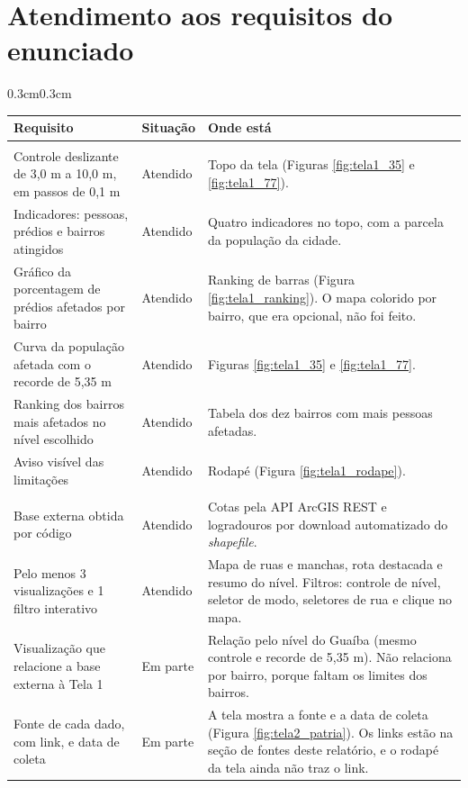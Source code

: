 \documentclass[12pt,a4paper]{article}
\begin{document}
\section{Atendimento aos requisitos do enunciado}
    \begin{adjustwidth}{0.3cm}{0.3cm}
    \small
    \begin{tabularx}{\linewidth}{|>{\raggedright\arraybackslash}p{5.6cm}|>{\raggedright\arraybackslash}p{2.4cm}|X|}
        \hline
        \textbf{Requisito} & \textbf{Situação} & \textbf{Onde está} \\ \hline
        \multicolumn{3}{|l|}{\textbf{Tela 1}} \\ \hline
        Controle deslizante de 3,0 m a 10,0 m, em passos de 0,1 m & Atendido & Topo da tela (Figuras \ref{fig:tela1_35} e \ref{fig:tela1_77}). \\ \hline
        Indicadores: pessoas, prédios e bairros atingidos & Atendido & Quatro indicadores no topo, com a parcela da população da cidade. \\ \hline
        Gráfico da porcentagem de prédios afetados por bairro & Atendido & Ranking de barras (Figura \ref{fig:tela1_ranking}). O mapa colorido por bairro, que era opcional, não foi feito. \\ \hline
        Curva da população afetada com o recorde de 5,35 m & Atendido & Figuras \ref{fig:tela1_35} e \ref{fig:tela1_77}. \\ \hline
        Ranking dos bairros mais afetados no nível escolhido & Atendido & Tabela dos dez bairros com mais pessoas afetadas. \\ \hline
        Aviso visível das limitações & Atendido & Rodapé (Figura \ref{fig:tela1_rodape}). \\ \hline
        \multicolumn{3}{|l|}{\textbf{Tela 2}} \\ \hline
        Base externa obtida por código & Atendido & Cotas pela API ArcGIS REST e logradouros por download automatizado do \textit{shapefile}. \\ \hline
        Pelo menos 3 visualizações e 1 filtro interativo & Atendido & Mapa de ruas e manchas, rota destacada e resumo do nível. Filtros: controle de nível, seletor de modo, seletores de rua e clique no mapa. \\ \hline
        Visualização que relacione a base externa à Tela 1 & Em parte & Relação pelo nível do Guaíba (mesmo controle e recorde de 5,35 m). Não relaciona por bairro, porque faltam os limites dos bairros. \\ \hline
        Fonte de cada dado, com link, e data de coleta & Em parte & A tela mostra a fonte e a data de coleta (Figura \ref{fig:tela2_patria}). Os links estão na seção de fontes deste relatório, e o rodapé da tela ainda não traz o link. \\ \hline
    \end{tabularx}
    \end{adjustwidth}
\end{document}
